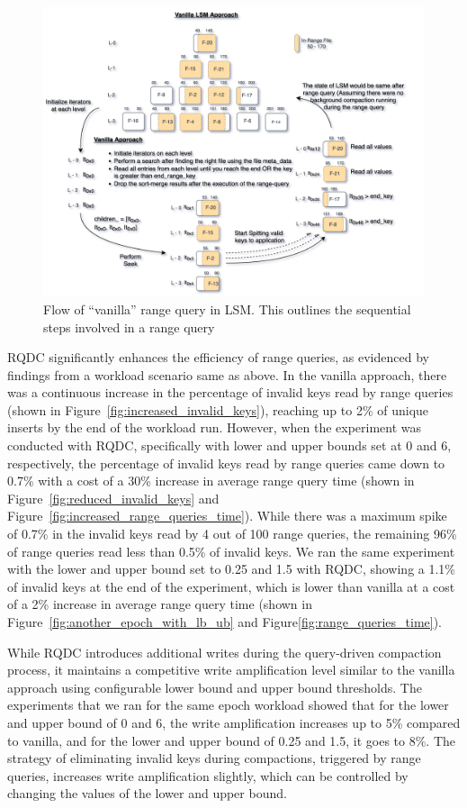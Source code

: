 \begin{figure}
    \includegraphics[scale=0.11]{Figures/Vanilla Range Query vanilla.png}
    \caption{Flow of ``vanilla'' range query in LSM. This outlines the sequential steps involved in a range 
    query}\label{fig:vanilla_range_query}
\end{figure}

RQDC significantly enhances the efficiency of range queries, as evidenced by findings from a workload scenario same as 
above. In the vanilla approach, there was a continuous increase in the 
percentage of invalid keys read by range queries (shown in Figure~\ref{fig:increased_invalid_keys}), reaching up to 2\% of unique inserts by the end of the workload run. 
However, when the experiment was conducted with RQDC, specifically with lower and upper bounds set at 0 and 6, 
respectively, the percentage of invalid keys read by range queries came down to 0.7\% with a cost of a 30\% increase in 
average range query time (shown in Figure~\ref{fig:reduced_invalid_keys} and Figure~\ref{fig:increased_range_queries_time}). 
While there was a maximum spike of 0.7\% in the invalid keys read by 4 out of 100 range 
queries, the remaining 96\% of range queries read less than 0.5\% of invalid keys. We ran the same experiment with the 
lower and upper bound set to 0.25 and 1.5 with RQDC, showing a 1.1\% of invalid keys at the end of the experiment, 
which is lower than vanilla at a cost of a 2\% increase in average range query time (shown in Figure~\ref{fig:another_epoch_with_lb_ub} and Figure\ref{fig:range_queries_time}).

While RQDC introduces additional writes during the query-driven compaction process, it maintains a competitive write 
amplification level similar to the vanilla approach using configurable lower bound and upper bound thresholds. The 
experiments that we ran for the same epoch workload showed that for the lower and upper bound of 0 and 6, the 
write amplification increases up to 5\% compared to vanilla, and for the lower and upper bound of 0.25 and 1.5, it
goes to 8\%. The strategy of eliminating invalid keys during compactions, triggered by range queries, increases write 
amplification slightly, which can be controlled by changing the values of the lower and upper bound.
